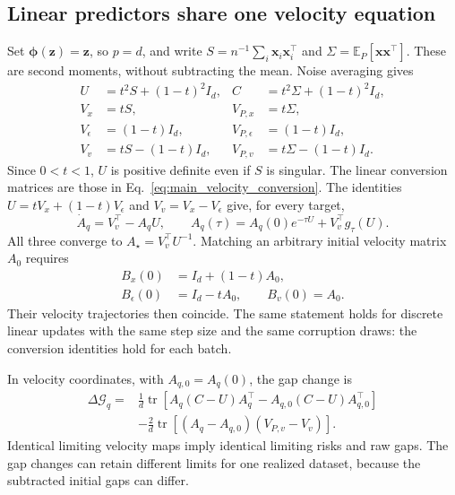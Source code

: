 \subsection{Linear predictors share one velocity equation}
Set $\boldsymbol\phi(\mathbf z)=\mathbf z$, so $p=d$, and write
$S=n^{-1}\sum_i\mathbf x_i\mathbf x_i^\top$ and
$\Sigma=\mathbb E_P[\mathbf x\mathbf x^\top]$.
These are second moments, without subtracting the mean. Noise averaging gives
\begin{align}
 U&=t^2S+(1-t)^2I_d,& C&=t^2\Sigma+(1-t)^2I_d,\\
 V_x&=tS,&V_{P,x}&=t\Sigma,\\
 V_\epsilon&=(1-t)I_d,&V_{P,\epsilon}&=(1-t)I_d,\\
 V_v&=tS-(1-t)I_d,&V_{P,v}&=t\Sigma-(1-t)I_d.
\end{align}
Since $0<t<1$, $U$ is positive definite even if $S$ is singular.
The linear conversion matrices are those in
Eq.~\eqref{eq:main_velocity_conversion}.
The identities $U=tV_x+(1-t)V_\epsilon$ and $V_v=V_x-V_\epsilon$
give, for every target,
\begin{equation}
 \dot A_q=V_v^\top-A_qU,
 \qquad
 A_q(\tau)=A_q(0)e^{-\tau U}+V_v^\top g_\tau(U).
 \label{eq:app_velocity_solution}
\end{equation}
All three converge to $A_\star=V_v^\top U^{-1}$.
Matching an arbitrary initial velocity matrix $A_0$ requires
\begin{equation}
 \begin{aligned}
 B_x(0)&=I_d+(1-t)A_0,\\
 B_\epsilon(0)&=I_d-tA_0,\qquad B_v(0)=A_0.
 \end{aligned}
 \label{eq:app_matched_initialization}
\end{equation}
Their velocity trajectories then coincide. The same statement holds for
discrete linear updates with the same step size and the same corruption
draws: the conversion identities hold for each batch.

In velocity coordinates, with $A_{q,0}=A_q(0)$, the gap change is
\begin{align}
 \Delta\mathcal G_q
 ={}&\frac1d\operatorname{tr}\left[
 A_q(C-U)A_q^\top-A_{q,0}(C-U)A_{q,0}^\top\right]\nonumber\\
 &-\frac2d\operatorname{tr}[(A_q-A_{q,0})(V_{P,v}-V_v)].
 \label{eq:app_velocity_gap}
\end{align}
Identical limiting velocity maps imply identical limiting risks and raw
gaps. The gap changes can retain different limits for one realized dataset,
because the subtracted initial gaps can differ.

